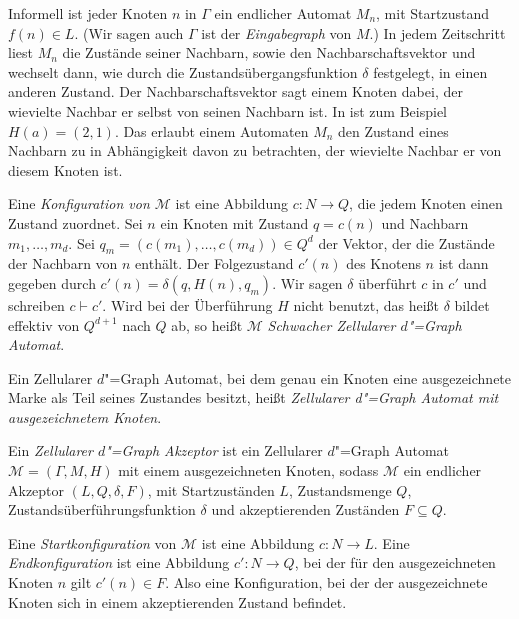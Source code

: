 \documentclass[11pt]{article}
\newcommand{\defWord}[1]{\emph{#1}}
\begin{document}
Informell ist jeder Knoten $n$ in $\Gamma$ ein endlicher Automat $M_n$, mit Startzustand $f\left(n\right) \in L$. (Wir sagen auch $\Gamma$ ist der \defWord{Eingabegraph} von $M$.) In jedem Zeitschritt liest $M_n$ die Zustände seiner Nachbarn, sowie den Nachbarschaftsvektor und wechselt dann, wie durch die Zustandsübergangsfunktion $\delta$ festgelegt, in einen anderen Zustand. Der Nachbarschaftsvektor sagt einem Knoten dabei, der wievielte Nachbar er selbst von seinen Nachbarn ist. In  ist zum Beispiel $H\left(a\right) = \left(2, 1\right)$. Das erlaubt einem Automaten $M_n$ den Zustand eines Nachbarn zu in Abhängigkeit davon zu betrachten, der wievielte Nachbar er von diesem Knoten ist.
\begin{definition}
	Eine \defWord{Konfiguration von $\mathcal{M}$} ist eine Abbildung $c : N \rightarrow Q$, die jedem Knoten einen Zustand zuordnet.
	Sei $n$ ein Knoten mit Zustand $q = c\left(n\right)$ und Nachbarn $m_1, \dots, m_d$. 
	Sei $q_m = \left( c\left( m_1\right), \dots , c\left(m_d\right)\right) \in Q^d$ der Vektor, der die Zustände der Nachbarn von $n$ enthält. 
	Der Folgezustand $c'\left( n\right)$ des Knotens $n$ ist dann gegeben durch $c'\left(n\right) = \delta\left(q, H\left(n\right),q_m \right) $. Wir sagen $\delta$ überführt $c$ in $c'$ und schreiben $c \vdash c'$.
	Wird bei der Überführung $H$ nicht benutzt, das heißt $\delta$ bildet effektiv von $Q^{d+1}$ nach $Q$ ab, so heißt $\mathcal{M}$ \defWord{Schwacher Zellularer $d$"=Graph Automat}.
\end{definition}
\begin{definition}
	Ein Zellularer $d$"=Graph Automat, bei dem genau ein Knoten eine ausgezeichnete Marke als Teil seines Zustandes  besitzt, heißt \defWord{Zellularer d"=Graph Automat mit ausgezeichnetem Knoten}.
	
	Ein \defWord{Zellularer $d$"=Graph Akzeptor} ist ein Zellularer $d$"=Graph Automat $\mathcal{M} = \left(\Gamma, M, H \right)$ mit einem ausgezeichneten Knoten, sodass $\mathcal{M}$ ein endlicher Akzeptor $\left(L, Q, \delta, F\right)$, mit Startzuständen $L$, Zustandsmenge $Q$, Zustandsüberführungsfunktion $\delta$ und akzeptierenden Zuständen $F \subseteq Q$.
	
	Eine \defWord{Startkonfiguration} von $\mathcal{M}$ ist eine Abbildung $c : N \rightarrow L$. Eine \defWord{Endkonfiguration} ist eine Abbildung $c' : N \rightarrow Q$, bei der für den ausgezeichneten Knoten $\hat{n}$ gilt $c'\left(n\right) \in F$. Also eine Konfiguration, bei der der ausgezeichnete Knoten sich in einem akzeptierenden Zustand befindet.
\end{definition}
\end{document}
